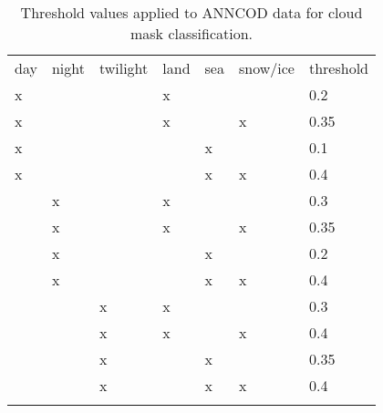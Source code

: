 \begin{table}[h]
  \caption{Threshold values applied to ANNCOD data for cloud mask classification.}
  \begin{tabular}{llllll|l} %
    \tophline
    day & night & twilight & land & sea & snow/ice & threshold \\
    \middlehline
    x   &       &          & x    &     &          & 0.2  \\
    x   &       &          & x    &     & x        & 0.35 \\
    x   &       &          &      & x   &          & 0.1  \\
    x   &       &          &      & x   & x        & 0.4  \\ \middlehline
    & x     &          & x    &     &          & 0.3  \\
    & x     &          & x    &     & x        & 0.35 \\
    & x     &          &      & x   &          & 0.2  \\
    & x     &          &      & x   & x        & 0.4  \\ \middlehline
    &       & x        & x    &     &          & 0.3  \\
    &       & x        & x    &     & x        & 0.4  \\
    &       & x        &      & x   &          & 0.35 \\
    &       & x        &      & x   & x        & 0.4  \\ \bottomhline
  \end{tabular}
  \label{tab:ANN_thresholds}
\end{table}


